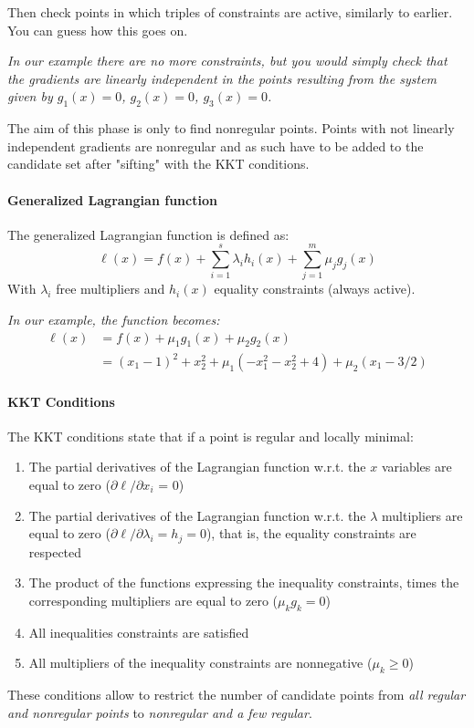 Then check points in which triples of constraints are active, similarly to earlier. You can guess how this goes on.

\textit{In our example there are no more constraints, but you would simply check that the gradients are linearly independent in the points resulting from the system given by $g_1(x) = 0$, $g_2(x) = 0$, $g_3(x) = 0$.}

The aim of this phase is only to find nonregular points. Points with not linearly independent gradients are nonregular and as such have to be added to the candidate set after "sifting" with the KKT conditions.

\paragraph{Generalized Lagrangian function} The generalized Lagrangian function is defined as:
$$ \ell (x) = f(x) + \sum_{i = 1}^s \lambda_i h_i (x) + \sum_{j = 1}^m \mu_j g_j (x) $$
With $\lambda_i$ free multipliers and $h_i (x)$ equality constraints (always active).

\textit{In our example, the function becomes:
\begin{align*}
	\ell (x) & = f(x) + \mu_1 g_1 (x) + \mu_2 g_2 (x) \\
	& = (x_1 - 1)^2 + x_2^2 + \mu_1\left(-x_1^2 - x_2^2 + 4\right) + \mu_2 (x_1 - 3/2)
\end{align*}
}

\paragraph{KKT Conditions} The KKT conditions state that if a point is regular and locally minimal: 
\begin{enumerate}
	\item The partial derivatives of the Lagrangian function w.r.t. the $x$ variables are equal to zero ($\partial \ell / \partial x_i$ = 0)
	
	\item The partial derivatives of the Lagrangian function w.r.t. the $\lambda$ multipliers are equal to zero ($\partial \ell / \partial \lambda_i = h_j = 0$), that is, the equality constraints are respected
	
	\item The product of the functions expressing the inequality constraints, times the corresponding multipliers are equal to zero ($\mu_k g_k = 0$)
	
	\item All inequalities constraints are satisfied
	
	\item All multipliers of the inequality constraints are nonnegative ($\mu_k \geq 0$)
\end{enumerate}
These conditions allow to restrict the number of candidate points from \textit{all regular and nonregular points} to \textit{nonregular and a few regular}.

